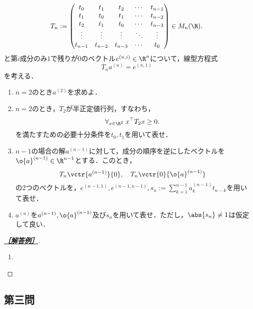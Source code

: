 \documentclass[uplatex,dvipdfmx]{jsarticle}
\begin{document}
\begin{tcolorbox}[colframe=ForestGreen, colback=ForestGreen!10!white,breakable,colbacktitle=ForestGreen!40!white,coltitle=black,fonttitle=\bfseries\sffamily,
    title=第２問]
    \begin{problem}\label{prob-17-8-2}
        \[T_n:=\begin{pmatrix}t_0&t_1&t_2&\cdots&t_{n-1}\\
        t_1&t_0&t_1&\cdots&t_{n-2}\\
        t_2&t_1&t_0&\cdots&t_{n-3}\\
        \vdots&\vdots&\vdots&\ddots&\vdots\\
        t_{n-1}&t_{n-2}&t_{n-3}&\cdots&t_0
        \end{pmatrix}\in M_n(\R).\]
        と第$i$成分のみ$1$で残りが$0$のベクトル$e^{(n,i)}\in\R^n$について，線型方程式
        \[T_na^{(n)}=e^{(n,1)}\]を考える．
        \begin{enumerate}[{問}1]
            \item $n=2$のとき$a^{(2)}$を求めよ．
            \item $n=2$のとき，$T_2$が半正定値行列，すなわち，
            \[\forall_{x\in\R^2}\;x^\top T_2x\ge0.\]
            を満たすための必要十分条件を$t_0,t_1$を用いて表せ．
            \item $n-1$の場合の解$a^{(n-1)}$に対して，成分の順序を逆にしたベクトルを$\o{a}^{(n-1)}\in\R^{n-1}$とする．このとき，
            \[T_n\vctr{a^{(n-1)}}{0},\quad T_n\vctr{0}{\o{a}^{(n-1)}}\]
            の2つのベクトルを，$e^{(n-1,1)},e^{(n-1,n-1)},s_n:=\sum_{k=1}^{n-1}a_k^{(n-1)}t_{n-k}$を用いて表せ．
            \item $a^{(n)}$を$a^{(n-1)},\o{a}^{(n-1)}$及び$s_n$を用いて表せ．ただし，$\abs{s_n}\ne1$は仮定して良い．
        \end{enumerate}
    \end{problem}
\end{tcolorbox}
\begin{proof}[\textbf{\underline{［解答例］}}]\mbox{}
    \begin{enumerate}
        \item 
    \end{enumerate}
\end{proof}

\subsection{第三問}
\end{document}
